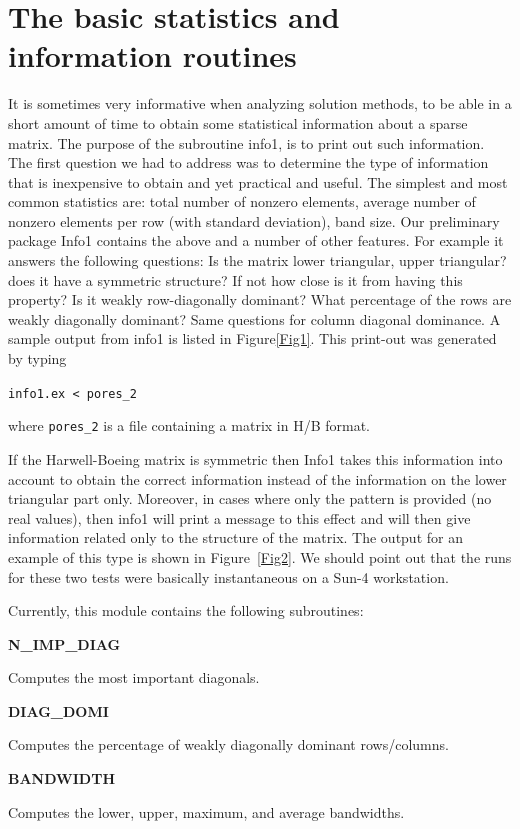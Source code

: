 \documentclass[12pt]{article}
\def\marg#1{\parbox[b]{1.3in}{\bf #1}}
\def\disp#1{\parbox[t]{4.62in}{#1} \vskip 0.2in }
\begin{document}
\section{The basic statistics and information routines}
It is sometimes very  informative when analyzing
solution methods, to be able in a short amount of time to 
obtain some statistical information about a sparse matrix.
The purpose of the subroutine info1, is to print out such
information. The first question we had to address 
was to determine the type of information that
is inexpensive to obtain and yet practical and useful.
The simplest and most common statistics
are: total number of nonzero elements, average number of nonzero
elements per row (with standard deviation), band size.
Our preliminary package Info1 contains the above and a 
number of other features. For example it answers the following
questions: Is the matrix lower triangular, upper triangular?
does it have a symmetric structure? If not how close is it 
from having this property? Is it weakly row-diagonally dominant?
What percentage of the rows are weakly diagonally dominant?
Same questions for column diagonal dominance.
A sample output from  info1 is listed in 
Figure\ref{Fig1}. This print-out was  generated by typing 
\begin{center}
{\tt info1.ex < pores\_2}
\end{center}
where {\tt pores\_2} is a file containing a matrix in H/B format.

If the Harwell-Boeing matrix is symmetric then Info1 takes this
information into account to obtain the correct information
instead of the information on  the lower triangular part only.
Moreover, in cases where only the pattern is provided (no real
values), then info1 will print a message to this effect and 
will then give information related only to the structure of 
the matrix. The output for an example of this type is shown in 
Figure~\ref{Fig2}. We should point out that the runs for these
two tests were basically instantaneous on a Sun-4 workstation.

Currently, this module contains the following subroutines:

\vskip 0.3in
 
\marg{ N\_IMP\_DIAG }\disp{ Computes the most important diagonals.}

\marg{ DIAG\_DOMI }\disp{ Computes the percentage of weakly diagonally 
dominant rows/columns.}

\marg{ BANDWIDTH }\disp{ Computes the lower, upper, maximum, and 
average bandwidths.}
\end{document}
